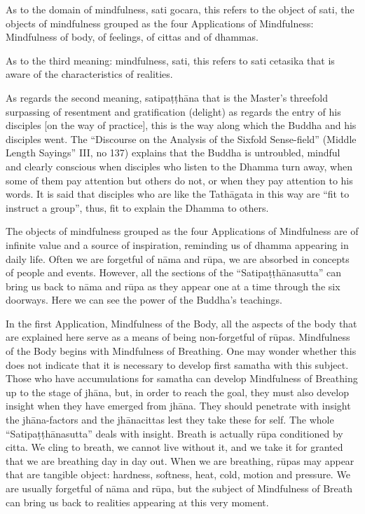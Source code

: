 As to the domain of mindfulness, sati gocara, this refers to the object of sati, the objects of mindfulness grouped as the four Applications of Mindfulness: Mindfulness of body, of feelings, of cittas and of dhammas.

As to the third meaning: mindfulness, sati, this refers to sati cetasika that is aware of the characteristics of realities.

As regards the second meaning, satipaṭṭhāna that is the Master’s threefold surpassing of resentment and gratification (delight) as regards the entry of his disciples [on the way of practice], this is the way along which the Buddha and his disciples went.
The ``Discourse on the Analysis of the Sixfold Sense-field'' (Middle Length Sayings'' III, no 137) explains that the Buddha is untroubled, mindful and clearly conscious when disciples who listen to the Dhamma turn away, when some of them pay attention but others do not, or when they pay attention to his words.
It is said that disciples who are like the Tathāgata in this way are ``fit to instruct a group'', thus, fit to explain the Dhamma to others.

The objects of mindfulness grouped as the four Applications of Mindfulness are of infinite value and a source of inspiration, reminding us of dhamma appearing in daily life. Often we are forgetful of nāma and rūpa, we are absorbed in concepts of people and events. However, all the sections of the ``Satipaṭṭhānasutta'' can bring us back to nāma and rūpa as they appear one at a time through the six doorways. Here we can see the power of the Buddha's teachings.

In the first Application, Mindfulness of the Body, all the aspects of the body that are explained here serve as a means of being non-forgetful of rūpas.
Mindfulness of the Body begins with Mindfulness of Breathing. One may wonder whether this does not indicate that it is necessary to develop first samatha with this subject. Those who have accumulations for samatha can develop Mindfulness of Breathing up to the stage of jhāna, but, in order to reach the goal, they must also develop insight when they have emerged from jhāna. They should penetrate with insight the jhāna-factors and the jhānacittas lest they take these for self. The whole ``Satipaṭṭhānasutta'' deals with insight. Breath is actually rūpa conditioned by citta. We cling to breath, we cannot live without it, and we take it for granted that we are breathing day in day out. When we are breathing, rūpas may appear that are tangible object: hardness, softness, heat, cold, motion and pressure. We are usually forgetful of nāma and rūpa, but the subject of Mindfulness of Breath can bring us back to realities appearing at this very moment.

